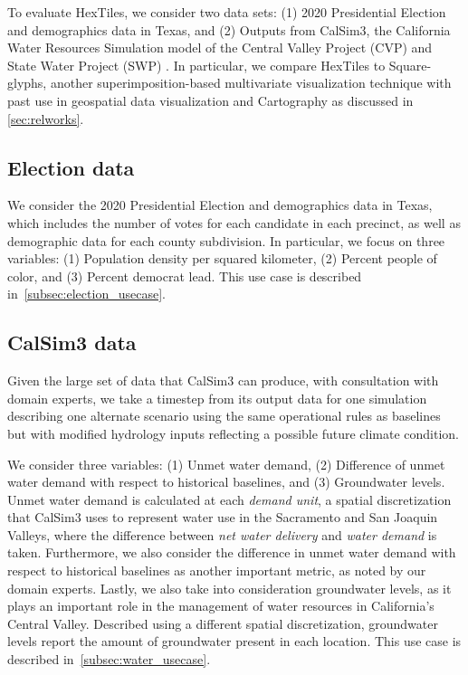 To evaluate HexTiles, we consider two data sets: (1) 2020 Presidential Election and demographics data in Texas, and (2) Outputs from CalSim3, the California Water Resources Simulation model of the Central Valley Project (CVP) and State Water Project (SWP) \cite{draper_calsim_2004}.
%
In particular, we compare HexTiles to Square-glyphs, another superimposition-based multivariate visualization technique with past use in geospatial data visualization and Cartography as discussed in \cref{sec:relworks}.

\subsection{Election data}
We consider the 2020 Presidential Election and demographics data in Texas, which includes the number of votes for each candidate in each precinct\cite{election_data}, as well as demographic data for each county subdivision\cite{census_2020}.
%
In particular, we focus on three variables: (1) Population density per squared kilometer, (2) Percent people of color, and (3) Percent democrat lead.
%
This use case is described in~\cref{subsec:election_usecase}.

\subsection{CalSim3 data}
Given the large set of data that CalSim3 can produce, with consultation with domain experts, we take a timestep from its output data for one simulation describing one alternate scenario using the same operational rules as baselines but with modified hydrology inputs reflecting a possible future climate condition. 
%

We consider three variables: (1) Unmet water demand, (2) Difference of unmet water demand with respect to historical baselines, and (3) Groundwater levels.
%
Unmet water demand is calculated at each \textit{demand unit}, a spatial discretization that CalSim3 uses to represent water use in the Sacramento and San Joaquin Valleys\cite{CalSim3}, where the difference between \textit{net water delivery} and \textit{water demand} is taken.
%
Furthermore, we also consider the difference in unmet water demand with respect to historical baselines as another important metric, as noted by our domain experts.
%
Lastly, we also take into consideration groundwater levels, as it plays an important role in the management of water resources in California's Central Valley.
%
Described using a different spatial discretization, groundwater levels report the amount of groundwater present in each location.
%
This use case is described in~\cref{subsec:water_usecase}.

